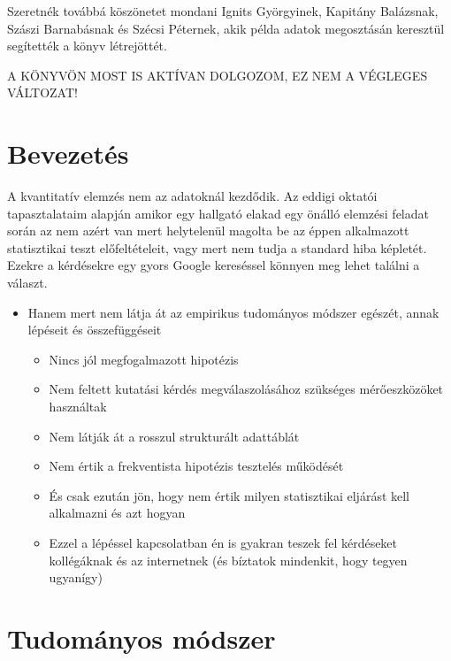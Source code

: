 \documentclass[
  letterpaper,
  DIV=11,
  numbers=noendperiod]{scrreprt}
\begin{document}

Szeretnék továbbá köszönetet mondani Ignits Györgyinek, Kapitány
Balázsnak, Szászi Barnabásnak és Szécsi Péternek, akik példa adatok
megosztásán keresztül segítették a könyv létrejöttét.

A KÖNYVÖN MOST IS AKTÍVAN DOLGOZOM, EZ NEM A VÉGLEGES VÁLTOZAT!


\hypertarget{bevezetuxe9s}{%
\chapter{Bevezetés}\label{bevezetuxe9s}}

A kvantitatív elemzés nem az adatoknál kezdődik. Az eddigi oktatói
tapasztalataim alapján amikor egy hallgató elakad egy önálló elemzési
feladat során az nem azért van mert helytelenül magolta be az éppen
alkalmazott statisztikai teszt előfeltételeit, vagy mert nem tudja a
standard hiba képletét. Ezekre a kérdésekre egy gyors Google kereséssel
könnyen meg lehet találni a választ.

\begin{itemize}
\item
  Hanem mert nem látja át az empirikus tudományos módszer egészét, annak
  lépéseit és összefüggéseit

  \begin{itemize}
  \item
    Nincs jól megfogalmazott hipotézis
  \item
    Nem feltett kutatási kérdés megválaszolásához szükséges
    mérőeszközöket használtak
  \item
    Nem látják át a rosszul strukturált adattáblát
  \item
    Nem értik a frekventista hipotézis tesztelés működését
  \item
    És csak ezután jön, hogy nem értik milyen statisztikai eljárást kell
    alkalmazni és azt hogyan
  \item
    Ezzel a lépéssel kapcsolatban én is gyakran teszek fel kérdéseket
    kollégáknak és az internetnek (és bíztatok mindenkit, hogy tegyen
    ugyanígy)
  \end{itemize}
\end{itemize}


\hypertarget{tudomuxe1nyos-muxf3dszer}{%
\chapter{Tudományos módszer}\label{tudomuxe1nyos-muxf3dszer}}
\end{document}
